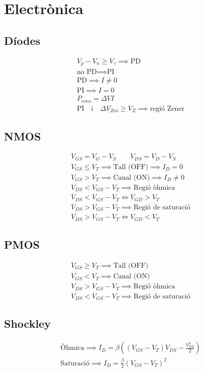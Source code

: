 \documentclass[10pt,twocolumn]{article}
\begin{document}
\section{Electrònica}
\subsection{Díodes}
\begin{gather*}
V_p - V_n \geq V_\gamma \implies \text{PD} \\
\text{no PD} \implies \text{PI} \\
\text{PD} \implies I \neq 0 \\
\text{PI} \implies I = 0 \\
P_{cons} = \Delta V I \\
\text{PI} \quad \text{i} \quad \Delta V_{Z \text{co}} \geq V_Z \implies \text{regió Zener}
\end{gather*}
\subsection{NMOS}
\begin{gather*}
V_{GS} = V_G - V_S \qquad V_{DS} = V_D - V_S \\
V_{GS} \leq V_T \implies \text{Tall (OFF)} \implies I_D = 0 \\
V_{GS} > V_T \implies \text{Canal (ON)} \implies I_D \neq 0  \\
V_{DS} < V_{GS} - V_T \implies \text{Regió òhmica} \\
V_{DS} < V_{GS} - V_T \iff V_{GD} > V_T \\
V_{DS} > V_{GS} - V_T \implies \text{Regió de saturació} \\
V_{DS} > V_{GS} - V_T \iff V_{GD} < V_T
\end{gather*}
\subsection{PMOS}
\begin{gather*}
    V_{GS} \geq V_T \implies \text{Tall (OFF)} \\
    V_{GS} < V_T \implies \text{Canal (ON)} \\
    V_{DS} > V_{GS} - V_T \implies \text{Regió òhmica} \\
    V_{DS} < V_{GS} - V_T \implies \text{Regió de saturació}
\end{gather*}
\subsection{Shockley}
\begin{gather*}
    \text{Òhmica} \implies I_D = \beta \left(\left(V_{GS} - V_T\right)V_{DS} - \frac{V_{DS}^{2}}{2}\right) \\
    \text{Saturació} \implies I_D = \frac{\beta}{2} \left(V_{GS} - V_T\right)^2
\end{gather*}
\end{document}
